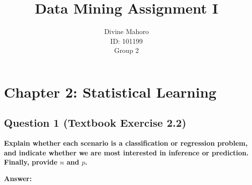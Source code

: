\documentclass[12pt,a4paper]{article}
\title{\textbf{Data Mining Assignment I}}
\author{Divine Mahoro\\ID: 101199\\Group 2}
\date{}
\begin{document}
\maketitle
\newpage

\section*{Chapter 2: Statistical Learning}

\subsection*{Question 1 (Textbook Exercise 2.2)}

\textbf{Explain whether each scenario is a classification or regression problem, and indicate whether we are most interested in inference or prediction. Finally, provide $n$ and $p$.}

\textbf{Answer:}
\end{document}
